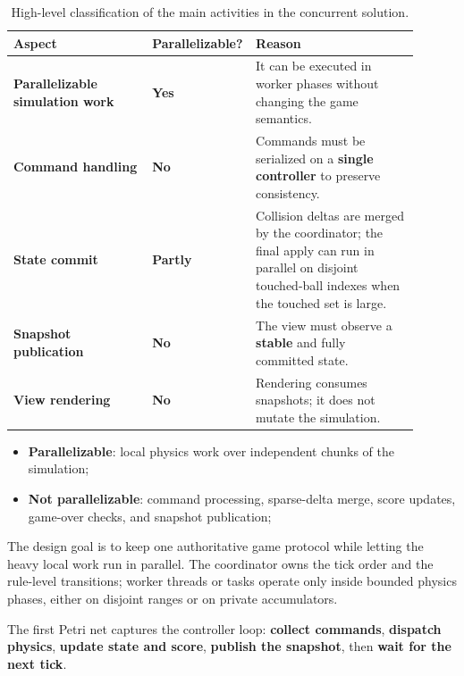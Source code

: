 \begin{table}[ht]
    \centering
    \small
    \setlength{\tabcolsep}{5pt}
    \renewcommand{\arraystretch}{1.18}
    \begin{tabular}{@{}p{0.34\linewidth}>{\centering\arraybackslash}p{0.16\linewidth}p{0.40\linewidth}@{}}
        \hline
        \textbf{Aspect} & \textbf{Parallelizable?} & \textbf{Reason} \\
        \hline
        \textbf{Parallelizable simulation work} & \textbf{Yes} & It can be executed in worker phases without changing the game semantics. \\
        \textbf{Command handling} & \textbf{No} & Commands must be serialized on a \textbf{single controller} to preserve consistency. \\
        \textbf{State commit} & \textbf{Partly} & Collision deltas are merged by the coordinator; the final apply can run in parallel on disjoint touched-ball indexes when the touched set is large. \\
        \textbf{Snapshot publication} & \textbf{No} & The view must observe a \textbf{stable} and fully committed state. \\
        \textbf{View rendering} & \textbf{No} & Rendering consumes snapshots; it does not mutate the simulation. \\
        \hline
    \end{tabular}
    \caption{High-level classification of the main activities in the concurrent solution.}
    \label{tab:parallelizable-vs-nonparallelizable}
\end{table}

\begin{itemize}
    \item \textbf{Parallelizable}: local physics work over independent chunks of the simulation;
    \item \textbf{Not parallelizable}: command processing, sparse-delta merge, score updates, game-over checks, and snapshot publication;
\end{itemize}

The design goal is to keep one authoritative game protocol while letting the heavy local work run in parallel. The coordinator owns the tick order and the rule-level transitions; worker threads or tasks operate only inside bounded physics phases, either on disjoint ranges or on private accumulators.

The first Petri net captures the controller loop: \textbf{collect commands}, \textbf{dispatch physics}, \textbf{update state and score}, \textbf{publish the snapshot}, then \textbf{wait for the next tick}.

